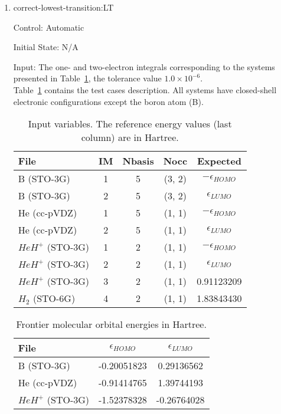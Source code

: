 \documentclass[12pt, titlepage]{article}
\begin{document}
\begin{enumerate}
	
	\item{correct-lowest-transition:LT\\}
	
	Control: Automatic
	
	Initial State: N/A
	
	Input: The one- and two-electron integrals corresponding to the systems 
	presented in Table~\ref{table:energies}, the tolerance value $1.0 \times 
	10^{-6}$.\\
	
	Table~\ref{table:energies} contains the test cases 
	description. All systems have closed-shell electronic configurations except 
	the boron atom (B).

	\begin{table}[h!]
		\centering
		\begin{tabular}{l c c c c}
			\toprule
			\textbf{File} & IM &\textbf{Nbasis} & \textbf{Nocc}& 
			\textbf{Expected}\\
			\midrule
			B (STO-3G) & 1 & 5& (3, 2)& $-\epsilon_{HOMO}$\\
			B (STO-3G) & 2 & 5& (3, 2)& $\epsilon_{LUMO}$\\
			He (cc-pVDZ)& 1& 5& (1, 1)& $-\epsilon_{HOMO}$\\
			He (cc-pVDZ)& 2& 5& (1, 1)& $\epsilon_{LUMO}$\\
			$HeH^{+}$ (STO-3G)& 1 & 2& (1, 1)& $-\epsilon_{HOMO}$\\
			$HeH^{+}$ (STO-3G)& 2 & 2& (1, 1)& $\epsilon_{LUMO}$\\
			$HeH^{+}$ (STO-3G)& 3 & 2& (1, 1)& 0.91123209\\
			$H_2$ (STO-6G)& 4 & 2& (1, 1)& 1.83843430\\			
		\end{tabular}
		\caption{Input variables. The reference energy values (last column) are 
		in Hartree.}
		\label{table:energies}
	\end{table}

	\begin{table}[h!]
		\centering
		\begin{tabular}{l c c}
			\toprule
			\textbf{File} & $\epsilon_{HOMO}$ & $\epsilon_{LUMO}$\\
			\midrule
			B (STO-3G) &-0.20051823& 0.29136562\\
			He (cc-pVDZ)& -0.91414765& 1.39744193\\
			$HeH^{+}$ (STO-3G)& -1.52378328 & -0.26764028\\		
		\end{tabular}
		\caption{Frontier molecular orbital energies in Hartree.}
		\label{table:koopman}
	\end{table}
	

\end{enumerate}
\end{document}
